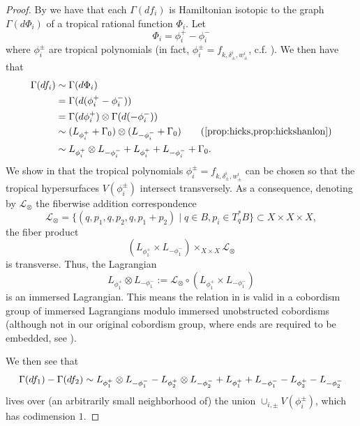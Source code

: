\documentclass[10pt]{amsart}
\theoremstyle{definition}
\theoremstyle{remark}
\newcommand{\mcal}{\mathcal}
\def\x{\times}
\begin{document}
\begin{proof}
    By  we have that each $\Gamma(df_i)$ is Hamiltonian isotopic to the graph $\Gamma(d\Phi_i)$ of a tropical rational function $\Phi_i$.
    Let 
    $$
        \Phi_i = \phi_i^+ - \phi_i^-
    $$
    where $\phi_i^\pm$ are tropical polynomials (in fact,  $\phi_i^\pm = f_{k,\delta^i_\pm,w^i_\pm}$, c.f. ).
    We then have that
    \begin{align}\label{eq:flat_section_to_hypersurfaces}
        \begin{split}
            \Gamma(df_i) &\sim \Gamma(d\Phi_i)\\
            & = \Gamma(d(\phi_i^+-\phi_i^-))\\
            & = \Gamma(d\phi_i^+)\otimes\Gamma(d(-\phi_i^-))\\
            &\sim (L_{\phi_i^+} + \Gamma_0) \otimes (L_{-\phi_i^-}+\Gamma_0)\qquad \text{(\Cref{prop:hicks,prop:hickshanlon})}\\
            &\sim L_{\phi_i^+} \otimes L_{-\phi_i^-} + L_{\phi_i^+} + L_{-\phi_i^-} + \Gamma_0.
        \end{split}
    \end{align}
    We show in  that the tropical polynomials $\phi_i^\pm = f_{k,\delta^i_\pm,w^i_\pm}$ can be chosen so that the tropical hypersurfaces $V(\phi_i^\pm)$ intersect transversely.
    As a consequence, denoting by $\mcal L_{\otimes}$ the fiberwise addition correspondence 
    $$
    \mcal L_{\otimes} = \{(q, p_1, q, p_2, q, p_1+p_2) \mid q \in B, p_i \in T^*_q B\} \subset X \x X \x X,
    $$
    the fiber product 
    $$
    (L_{\phi_1^+} \x L_{-\phi_1^-}) \x_{X\x X} \mathcal L_{\otimes}
    $$
    is transverse.
    Thus, the Lagrangian
    $$
        L_{\phi_1^+} \otimes L_{-\phi_1^-} := \mathcal L_{\otimes} \circ (L_{\phi_1^+} \x L_{-\phi_1^-})
    $$
    is an immersed Lagrangian.
    This means the relation in  is valid in a cobordism group of immersed Lagrangians modulo immersed unobstructed cobordisms (although not in our original cobordism group, where ends are required to be embedded, see ).


    We then see that 
    $$
        \Gamma(df_1) - \Gamma(df_2) \sim L_{\phi_1^+} \otimes L_{-\phi_1^-} - L_{\phi_2^+} \otimes L_{-\phi_2^-} + L_{\phi_1^+} + L_{-\phi_1^-} - L_{\phi_2^+} - L_{-\phi_2^-}\\
    $$
    lives over (an arbitrarily small neighborhood of) the union $\cup_{i,\pm}V(\phi_i^\pm)$, which has codimension $1$.
\end{proof}
\end{document}
